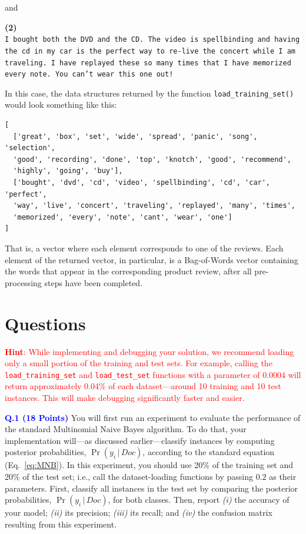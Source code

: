\documentclass[letterpaper]{article}
\newcommand{\HIGHLIGHT}[1]{\textcolor{blue}{\textbf{#1}}}
\begin{document}
\noindent and

\noindent \textbf{(2)} \\
\noindent \texttt{I bought both the DVD and the CD.  The video is spellbinding and having the cd in my car is the perfect way to re-live the concert while I am traveling. I have replayed these so many times that I have memorized every note.  You can't wear this one out!}

In this case, the data structures returned by the function \texttt{load\_training\_set()} would look something like this:
\noindent \begin{verbatim}
[
  ['great', 'box', 'set', 'wide', 'spread', 'panic', 'song', 'selection', 
  'good', 'recording', 'done', 'top', 'knotch', 'good', 'recommend', 
  'highly', 'going', 'buy'],
  ['bought', 'dvd', 'cd', 'video', 'spellbinding', 'cd', 'car', 'perfect', 
  'way', 'live', 'concert', 'traveling', 'replayed', 'many', 'times', 
  'memorized', 'every', 'note', 'cant', 'wear', 'one']
]
\end{verbatim}

\noindent That is, a vector where each element corresponds to one of the reviews. Each element of the returned vector, in particular, is a Bag-of-Words vector containing the words that appear in the corresponding product review, after all pre-processing steps have been completed.




\section{Questions}

\textcolor{red}{\textbf{Hint}: While implementing and debugging your solution, we recommend loading only a small portion of the training and test sets. For example, calling the \texttt{load\_training\_set} and \texttt{load\_test\_set} functions with a parameter of 0.0004 will return approximately 0.04\% of each dataset—around 10 training and 10 test instances. This will make debugging significantly faster and easier.}



\noindent \HIGHLIGHT{Q.1 (18 Points)} You will first run an experiment to evaluate the performance of the standard Multinomial Naive Bayes algorithm. To do that, your implementation will---as discussed earlier---classify instances by computing posterior probabilities, $\Pr(y_i \, | \, Doc)$, according to the standard equation (Eq.~\eqref{eq:MNB}). In this experiment, you should use 20\% of the training set and 20\% of the test set; i.e., call the dataset-loading functions by passing $0.2$ as their parameters. First, classify all instances in the test set by comparing the posterior probabilities, $\Pr(y_i \, | \, Doc)$, for both classes. Then, report \textit{(i)} the accuracy of your model; \textit{(ii)} its precision; \textit{(iii)} its recall; and \textit{(iv)} the confusion matrix resulting from this experiment. 
%
%
\end{document}
